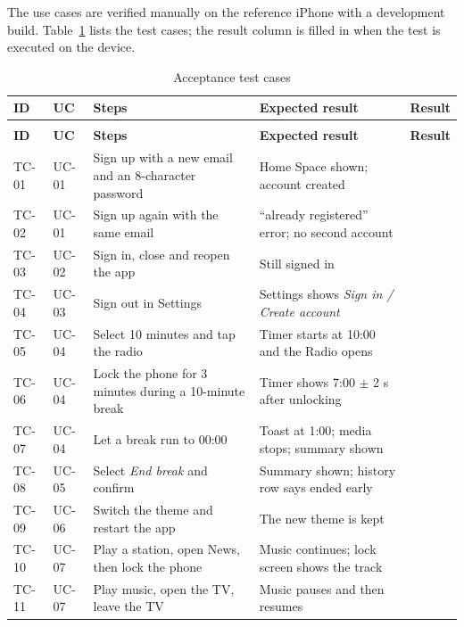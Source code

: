 The use cases are verified manually on the reference iPhone with a
development build. Table~\ref{tab:acceptance-tests} lists the test cases; the
result column is filled in when the test is executed on the device.

\begingroup
\small
\renewcommand{\arraystretch}{1.2}
\begin{longtable}{|>{\raggedright\arraybackslash}p{1.1cm}|>{\raggedright\arraybackslash}p{1.3cm}|>{\raggedright\arraybackslash}p{5.6cm}|>{\raggedright\arraybackslash}p{4.6cm}|>{\centering\arraybackslash}p{1.3cm}|}
\caption{Acceptance test cases}\label{tab:acceptance-tests}\\ \hline
\textbf{ID} & \textbf{UC} & \textbf{Steps} & \textbf{Expected result} & \textbf{Result} \\ \hline
\endfirsthead
\multicolumn{5}{c}{{\bfseries \tablename\ \thetable{} -- continued from previous page}} \\ \hline
\textbf{ID} & \textbf{UC} & \textbf{Steps} & \textbf{Expected result} & \textbf{Result} \\ \hline
\endhead
TC-01 & UC-01 & Sign up with a new email and an 8-character password & Home Space shown; account created & \\ \hline
TC-02 & UC-01 & Sign up again with the same email & ``already registered'' error; no second account & \\ \hline
TC-03 & UC-02 & Sign in, close and reopen the app & Still signed in & \\ \hline
TC-04 & UC-03 & Sign out in Settings & Settings shows \textit{Sign in / Create account} & \\ \hline
TC-05 & UC-04 & Select 10 minutes and tap the radio & Timer starts at 10:00 and the Radio opens & \\ \hline
TC-06 & UC-04 & Lock the phone for 3 minutes during a 10-minute break & Timer shows 7:00 $\pm$ 2 s after unlocking & \\ \hline
TC-07 & UC-04 & Let a break run to 00:00 & Toast at 1:00; media stops; summary shown & \\ \hline
TC-08 & UC-05 & Select \textit{End break} and confirm & Summary shown; history row says ended early & \\ \hline
TC-09 & UC-06 & Switch the theme and restart the app & The new theme is kept & \\ \hline
TC-10 & UC-07 & Play a station, open News, then lock the phone & Music continues; lock screen shows the track & \\ \hline
TC-11 & UC-07 & Play music, open the TV, leave the TV & Music pauses and then resumes & \\ \hline

\end{longtable}
